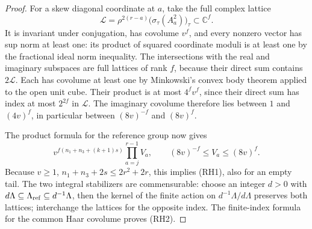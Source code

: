 \begin{proof}
For a skew diagonal coordinate at \(a\), take the full complex
lattice
\[
 \mathcal L=\rho^{2(r-a)}
            \bigl(\sigma_\tau(A_a^2)\bigr)_\tau
             \subset \mathbb C^f .
\]
It is invariant under conjugation, has covolume \(v^f\), and
every nonzero vector has sup norm at least one: its product
of squared coordinate moduli is at least one by the fractional
ideal norm inequality. The intersections with the real and
imaginary subspaces are full lattices of rank \(f\), because
their direct sum contains \(2\mathcal L\). Each has covolume
at least one by Minkowski's convex body theorem applied to
the open unit cube. Their product is at most \(4^f v^f\),
since their direct sum has index at most \(2^{2f}\) in
\(\mathcal L\). The imaginary covolume therefore lies between
\(1\) and \((4v)^f\), in particular between \((8v)^{-f}\)
and \((8v)^f\).

The product formula for the reference group now gives
\[
 v^{f(n_1+n_3+(k+1)s)}
       \prod_{a=j}^{r-1} V_a ,
 \qquad (8v)^{-f}\le V_a\le(8v)^f.
\]
Because \(v\ge1\), \(n_1+n_3+2s\le 2r^2+2r\),
this implies (RH1), also for an empty tail. The two
integral stabilizers are commensurable: choose an integer
\(d>0\) with \(d\Lambda\subseteq\Lambda_{\rm ref}\subseteq
d^{-1}\Lambda\), then the kernel of the finite action on
\(d^{-1}\Lambda/d\Lambda\) preserves both lattices; interchange
the lattices for the opposite index. The finite-index formula
for the common Haar covolume proves (RH2).
\end{proof}

